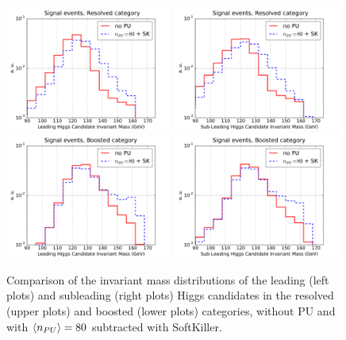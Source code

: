 \begin{figure}[t]
  \begin{center}
      \vspace{-1cm}
      \includegraphics[width=0.49\textwidth]{plots/m_H0_res_comp.pdf}
      \includegraphics[width=0.49\textwidth]{plots/m_H1_res_comp.pdf}
      \includegraphics[width=0.49\textwidth]{plots/m_H0_bst_comp.pdf}
      \includegraphics[width=0.49\textwidth]{plots/m_H1_bst_comp.pdf}
  \caption{\small
    Comparison of the invariant mass distributions of the leading (left plots)
    and subleading (right plots) Higgs candidates in the resolved
    (upper plots) and boosted (lower plots) categories,
    without PU and with $\left\langle n_{PU}\right\rangle=80$ subtracted with SoftKiller.
}
\label{fig:m_H_PU}
\end{center}
\end{figure}

